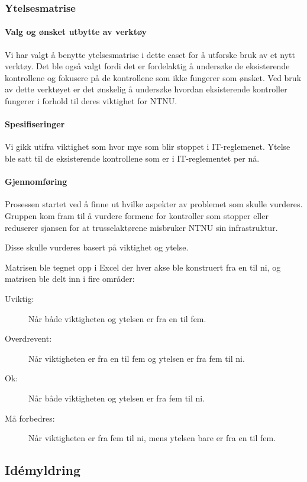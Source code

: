 \subsubsection{Ytelsesmatrise}

\paragraph{Valg og ønsket utbytte av verktøy}
Vi har valgt å benytte ytelsesmatrise i dette caset for å utforske bruk av et nytt verktøy. Det ble også valgt fordi det er fordelaktig å undersøke de eksisterende kontrollene og fokusere på de kontrollene som ikke fungerer som ønsket. Ved bruk av dette verktøyet er det ønskelig å undersøke hvordan eksisterende kontroller fungerer i forhold til deres viktighet for NTNU. 

\paragraph{Spesifiseringer}
Vi gikk utifra viktighet som hvor mye som blir stoppet i IT-reglemenet. Ytelse ble satt til de eksisterende kontrollene som er i IT-reglementet per nå.

\paragraph{Gjennomføring}
Prosessen startet ved å finne ut hvilke aspekter av problemet som skulle vurderes. Gruppen kom fram til å vurdere formene for kontroller som stopper eller reduserer sjansen for at trusselaktørene misbruker NTNU sin infrastruktur. 


Disse skulle vurderes basert på viktighet og ytelse. 

Matrisen ble tegnet opp i Excel der hver akse ble konstruert fra en til ni, og matrisen ble delt inn i fire områder:
\begin{description}
    \item[Uviktig:] Når både viktigheten og ytelsen er fra en til fem.
    \item[Overdrevent:] Når viktigheten er fra en til fem og ytelsen er fra fem til ni.
    \item[Ok:] Når både viktigheten og ytelsen er fra fem til ni.
    \item[Må forbedres:] Når viktigheten er fra fem til ni, mens ytelsen bare er fra en til fem.
\end{description}

\subsection{Idémyldring}

